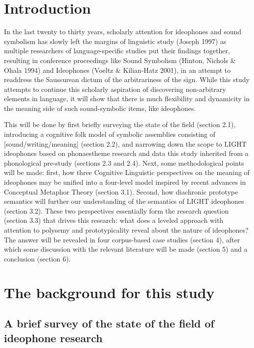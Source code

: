 \section{Introduction}\label{introduction}

In the last twenty to thirty years, scholarly attention for ideophones
and sound symbolism has slowly left the margins of linguistic study
(Joseph 1997) as multiple researchers of language-specific studies put
their findings together, resulting in conference proceedings like Sound
Symbolism (Hinton, Nichols \& Ohala 1994) and Ideophones (Voeltz \&
Kilian-Hatz 2001), in an attempt to readdress the Saussurean dictum of
the arbitrariness of the sign. While this study attempts to continue
this scholarly aspiration of discovering non-arbitrary elements in
language, it will show that there is much flexibility and dynamicity in
the meaning side of such sound-symbolic items, like ideophones.

This will be done by first briefly surveying the state of the field
(section 2.1), introducing a cognitive folk model of symbolic assemblies
consisting of {[}sound/writing/meaning{]} (section 2.2), and narrowing
down the scope to LIGHT ideophones based on phonaestheme research and
data this study inherited from a phonological pre-study (sections 2.3
and 2.4). Next, some methodological points will be made: first, how
three Cognitive Linguistic perspectives on the meaning of ideophones may
be unified into a four-level model inspired by recent advances in
Conceptual Metaphor Theory (section 3.1). Second, how diachronic
prototype semantics will further our understanding of the semantics of
LIGHT ideophones (section 3.2). These two perspectives essentially form
the research question (section 3.3) that drives this research: what does
a leveled approach with attention to polysemy and prototypicality reveal
about the nature of ideophones? The answer will be revealed in four
corpus-based case studies (section 4), after which some discussion with
the relevant literature will be made (section 5) and a conclusion
(section 6).

\section{The background for this
study}\label{the-background-for-this-study}

\subsection{A brief survey of the state of the field of ideophone
research}\label{a-brief-survey-of-the-state-of-the-field-of-ideophone-research}

